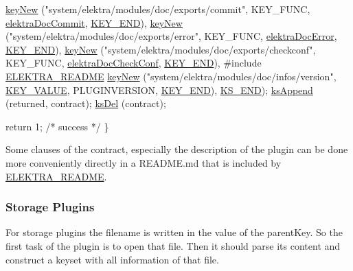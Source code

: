 \begin{DoxyCodeInclude}
                               \hyperlink{group__key_gad23c65b44bf48d773759e1f9a4d43b89}{keyNew} (\textcolor{stringliteral}{"system/elektra/modules/doc/exports/commit"}, KEY\_FUNC, 
      \hyperlink{group__plugin_ga52807469897b8acbada5bcc6b8c8ceab}{elektraDocCommit}, \hyperlink{group__key_gga9b703ca49f48b482def322b77d3e6bc8aa8adb6fcb92dec58fb19410eacfdd403}{KEY\_END}),
                               \hyperlink{group__key_gad23c65b44bf48d773759e1f9a4d43b89}{keyNew} (\textcolor{stringliteral}{"system/elektra/modules/doc/exports/error"}, KEY\_FUNC, 
      \hyperlink{group__plugin_gad74b35f558ac7c3262f6069c5c47dc79}{elektraDocError}, \hyperlink{group__key_gga9b703ca49f48b482def322b77d3e6bc8aa8adb6fcb92dec58fb19410eacfdd403}{KEY\_END}),
                               \hyperlink{group__key_gad23c65b44bf48d773759e1f9a4d43b89}{keyNew} (\textcolor{stringliteral}{"system/elektra/modules/doc/exports/checkconf"}, KEY\_FUNC, 
      \hyperlink{group__plugin_ga1c8702efe0f3853c2d7ecca0889f78e8}{elektraDocCheckConf}, \hyperlink{group__key_gga9b703ca49f48b482def322b77d3e6bc8aa8adb6fcb92dec58fb19410eacfdd403}{KEY\_END}),
#include \hyperlink{group__plugin_gabdcb97b05a83130c32bbde75db80fc50}{ELEKTRA\_README}
                               \hyperlink{group__key_gad23c65b44bf48d773759e1f9a4d43b89}{keyNew} (\textcolor{stringliteral}{"system/elektra/modules/doc/infos/version"}, 
      \hyperlink{group__key_gga9b703ca49f48b482def322b77d3e6bc8ac66e4a49d09212b79f5754ca6db5bd2e}{KEY\_VALUE}, PLUGINVERSION, \hyperlink{group__key_gga9b703ca49f48b482def322b77d3e6bc8aa8adb6fcb92dec58fb19410eacfdd403}{KEY\_END}), \hyperlink{group__keyset_ga7a28fce3773b2c873c94ac80b8b4cd54}{KS\_END});
                \hyperlink{group__keyset_ga21eb9c3a14a604ee3a8bdc779232e7b7}{ksAppend} (returned, contract);
                \hyperlink{group__keyset_ga27e5c16473b02a422238c8d970db7ac8}{ksDel} (contract);

                \textcolor{keywordflow}{return} 1; \textcolor{comment}{/* success */}
        \}
\end{DoxyCodeInclude}
 Some clauses of the contract, especially the description of the plugin can be done more conveniently directly in a R\+E\+A\+D\+M\+E.\+md that is included by \hyperlink{group__plugin_gabdcb97b05a83130c32bbde75db80fc50}{E\+L\+E\+K\+T\+R\+A\+\_\+\+R\+E\+A\+D\+ME}.\hypertarget{group__plugin_storage}{}\subsubsection{Storage Plugins}\label{group__plugin_storage}
For storage plugins the filename is written in the value of the parent\+Key. So the first task of the plugin is to open that file. Then it should parse its content and construct a keyset with all information of that file.

